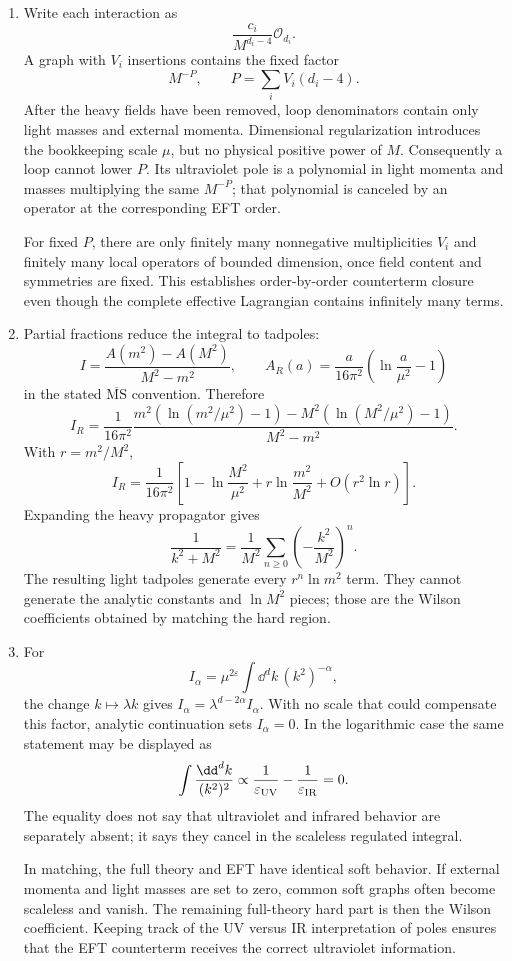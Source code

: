 \begin{enumerate}
\begin{enumerate}
\item
Write each interaction as
\[
 \frac{c_i}{M^{d_i-4}}\mathcal O_{d_i}.
\]
A graph with \(V_i\) insertions contains the fixed factor
\[
 M^{-P},\qquad P=\sum_iV_i(d_i-4).
\]
After the heavy fields have been removed, loop denominators contain only
light masses and external momenta.  Dimensional regularization introduces
the bookkeeping scale \(\mu\), but no physical positive power of \(M\).
Consequently a loop cannot lower \(P\).  Its ultraviolet pole is a
polynomial in light momenta and masses multiplying the same \(M^{-P}\);
that polynomial is canceled by an operator at the corresponding EFT order.

For fixed \(P\), there are only finitely many nonnegative multiplicities
\(V_i\) and finitely many local operators of bounded dimension, once field
content and symmetries are fixed.  This establishes order-by-order
counterterm closure even though the complete effective Lagrangian contains
infinitely many terms.
\item
Partial fractions reduce the integral to tadpoles:
\[
 I=\frac{A(m^2)-A(M^2)}{M^2-m^2},\qquad
 A_R(a)=\frac{a}{16\pi^2}\left(\ln\frac a{\mu^2}-1\right)
\]
in the stated \(\overline{\mathrm{MS}}\) convention.  Therefore
\[
 I_R=\frac1{16\pi^2}
 \frac{m^2(\ln(m^2/\mu^2)-1)
 -M^2(\ln(M^2/\mu^2)-1)}{M^2-m^2}.
\]
With \(r=m^2/M^2\),
\[
 I_R=\frac1{16\pi^2}\left[
 1-\ln\frac{M^2}{\mu^2}
 +r\ln\frac{m^2}{M^2}+O(r^2\ln r)\right].
\]
Expanding the heavy propagator gives
\[
 \frac1{k^2+M^2}=\frac1{M^2}
 \sum_{n\geq0}\left(-\frac{k^2}{M^2}\right)^n .
\]
The resulting light tadpoles generate every \(r^n\ln m^2\) term.  They
cannot generate the analytic constants and \(\ln M^2\) pieces; those are
the Wilson coefficients obtained by matching the hard region.
\item
For
\[
 I_\alpha=\mu^{2\varepsilon}\int \dd^dk\,(k^2)^{-\alpha},
\]
the change \(k\mapsto\lambda k\) gives
\(I_\alpha=\lambda^{d-2\alpha}I_\alpha\).  With no scale that could
compensate this factor, analytic continuation sets \(I_\alpha=0\).  In the
logarithmic case the same statement may be displayed as
\[
 \int\frac{\dd^dk}{(k^2)^2}
 \propto\frac1{\varepsilon_{\rm UV}}
 -\frac1{\varepsilon_{\rm IR}}=0.
\]
The equality does not say that ultraviolet and infrared behavior are
separately absent; it says they cancel in the scaleless regulated integral.

In matching, the full theory and EFT have identical soft behavior.  If
external momenta and light masses are set to zero, common soft graphs often
become scaleless and vanish.  The remaining full-theory hard part is then
the Wilson coefficient.  Keeping track of the UV versus IR interpretation
of poles ensures that the EFT counterterm receives the correct ultraviolet
information.
\end{enumerate}


\end{enumerate}
